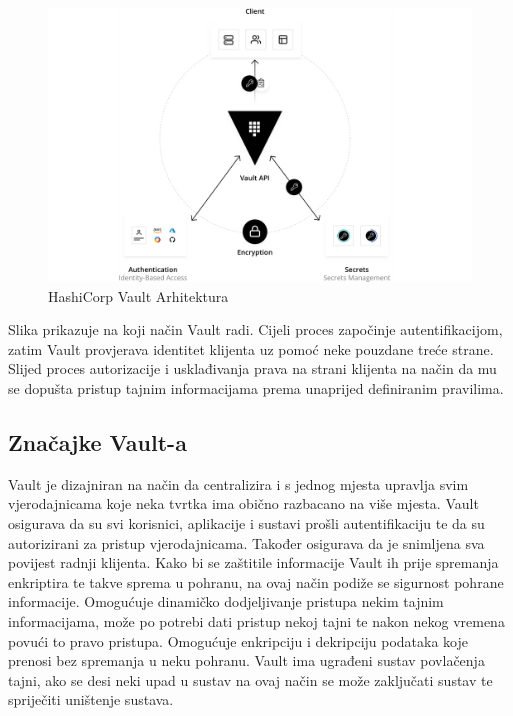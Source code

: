 \documentclass[]{foi}
\begin{document}
\begin{figure}[htbp]
    \centering
    \includegraphics[width=1.0\textwidth]{assets/hashicorp-arhitektura.png}
    \caption{HashiCorp Vault Arhitektura \cite{hashicorp-vault-what-is}}
\end{figure}

Slika prikazuje na koji način Vault radi.
Cijeli proces započinje autentifikacijom, zatim Vault provjerava identitet klijenta uz pomoć neke pouzdane treće strane.
Slijed proces autorizacije i usklađivanja prava na strani klijenta na način da mu se dopušta pristup tajnim informacijama prema unaprijed definiranim pravilima.

\pagebreak

\subsection{Značajke Vault-a}

Vault je dizajniran na način da centralizira i s jednog mjesta upravlja svim vjerodajnicama koje neka tvrtka ima obično razbacano na više mjesta.
Vault osigurava da su svi korisnici, aplikacije i sustavi prošli autentifikaciju te da su autorizirani za pristup vjerodajnicama.
Također osigurava da je snimljena sva povijest radnji klijenta.
Kako bi se zaštitile informacije Vault ih prije spremanja enkriptira te takve sprema u pohranu, na ovaj način podiže se sigurnost pohrane informacije.
Omogućuje dinamičko dodjeljivanje pristupa nekim tajnim informacijama, može po potrebi dati pristup nekoj tajni te nakon nekog vremena povući to pravo pristupa.
Omogućuje enkripciju i dekripciju podataka koje prenosi bez spremanja u neku pohranu.
Vault ima ugrađeni sustav povlačenja tajni, ako se desi neki upad u sustav na ovaj način se može zaključati sustav te spriječiti uništenje sustava.
\end{document}

